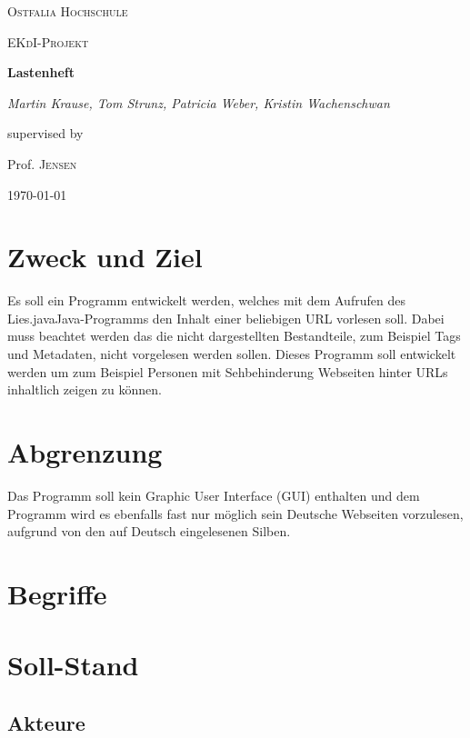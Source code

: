 \documentclass[12pt]{scrartcl}
\begin{document}
\begin{titlepage}
	\centering
	{\scshape\LARGE Ostfalia Hochschule \par}
	\vspace{1cm}
	{\scshape\Large EKdI-Projekt\par}
	\vspace{1.5cm}
	{\huge\bfseries Lastenheft\par}
	\vspace{2cm}
	{\Large\itshape Martin Krause, Tom Strunz, Patricia Weber, Kristin Wachenschwan\par}
	\vfill
	supervised by\par
	Prof. \textsc{Jensen}

	\vfill

	{\large \today\par}
\end{titlepage}


\tableofcontents
\newpage


\section{Zweck und Ziel}
Es soll ein Programm entwickelt werden, welches mit dem Aufrufen des \glqq Lies.java\grqq Java-Programms den Inhalt einer beliebigen URL vorlesen soll. Dabei muss beachtet werden das die nicht dargestellten Bestandteile, zum Beispiel Tags und Metadaten, nicht vorgelesen werden sollen. Dieses Programm soll entwickelt werden um zum Beispiel Personen mit Sehbehinderung Webseiten hinter URLs inhaltlich zeigen zu können.

\section{Abgrenzung}
Das Programm soll kein Graphic User Interface (GUI) enthalten und dem Programm wird es ebenfalls fast nur möglich sein Deutsche Webseiten vorzulesen, aufgrund von den auf Deutsch eingelesenen Silben.

\section{Begriffe}


\section{Soll-Stand}


\subsection{Akteure}
\end{document}
